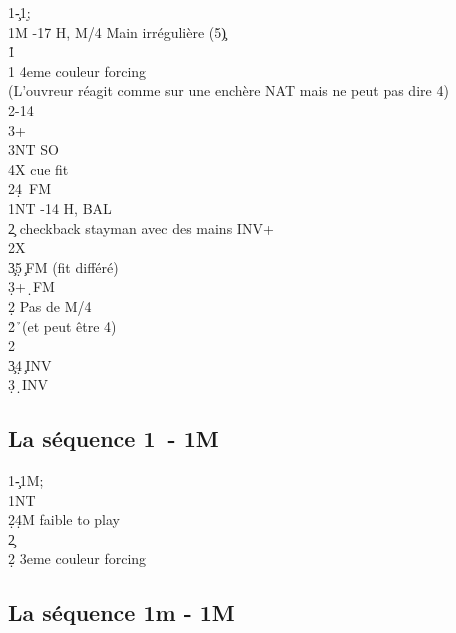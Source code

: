 \documentclass[a4paper]{article}
\begin{document}
\begin{bidtable}
1\c-1\d;\\
1M -17 H, M/4 Main irrégulière (5\c )\\
1\h\+\\
1\s \> 4eme couleur forcing\\
\>(L’ouvreur réagit comme sur une enchère NAT mais ne peut pas dire 4\s ) \+\\
2\s {}-14\\
3\s {}+\+\\
3NT \> SO\\
4X \> cue fit \s \-\-\\
2\s {}\d 4\s\ FM\-\\
1NT -14 H, BAL\+\\
2\c \> checkback stayman avec des mains INV+\+\\
2X\+\\
3\c {}\d 5\c\ FM (fit différé)\\
3\d {}+\d\ FM\-\\
2\d \> Pas de M/4\\
2\h {}\h\ (et peut être 4\s )\\
2\s {}\s \-\\
3\c {}\d 4\c\ INV\\
3\d {}\d\ INV\-
\end{bidtable}

\subsection{La séquence 1\pdfc\ - 1M}

\begin{bidtable}
1\c-1M;\\
1NT\+\\
2\d {}\d 4M faible to play\-\\
2\c\+\\
2\d \> 3eme couleur forcing\-
\end{bidtable}

\subsection{La séquence 1m - 1M}
\end{document}
